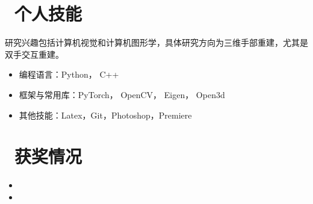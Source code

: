 \documentclass{resume}
\begin{document}
\section{\faCogs\ 个人技能}
研究兴趣包括计算机视觉和计算机图形学，具体研究方向为三维手部重建，尤其是双手交互重建。
\begin{itemize} [parsep=0.5ex]
  \item 编程语言：Python， C++
  \item 框架与常用库：PyTorch， OpenCV， Eigen， Open3d
  \item 其他技能：Latex，Git，Photoshop，Premiere
\end{itemize}

\section{\faTrophy\ 获奖情况}
\begin{itemize}
    \item{}
    \item {}
\end{itemize}
\end{document}
